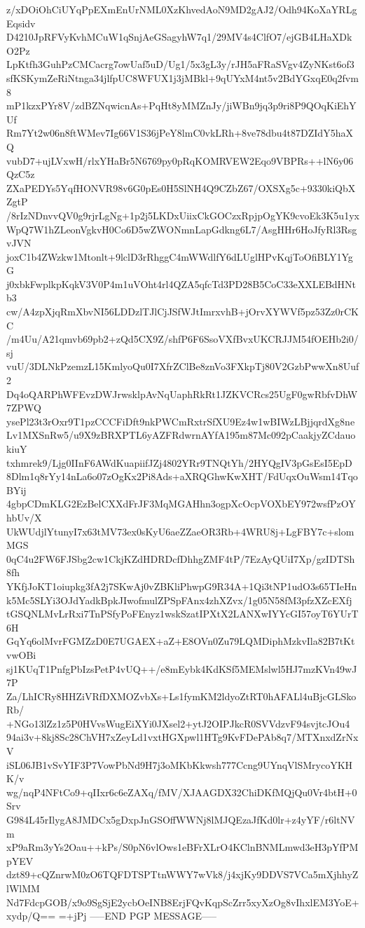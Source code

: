 z/xDOiOhCiUYqPpEXmEnUrNML0XzKhvedAoN9MD2gAJ2/Odh94KoXaYRLgEqsidv
D4210JpRFVyKvhMCuW1qSnjAeGSagyhW7q1/29MV4s4ClfO7/ejGB4LHaXDkO2Pz
LpKtfh3GuhPzCMCacrg7owUaf5uD/Ug1/5x3gL3y/rJH5aFRaSVgv4ZyNKst6of3
sfKSKymZeRiNtnga34jlfpUC8WFUX1j3jMBkl+9qUYxM4nt5v2BdYGxqE0q2fvm8
mP1kzxPYr8V/zdBZNqwicnAs+PqHt8yMMZnJy/jiWBn9jq3p9ri8P9QOqKiEhYUf
Rm7Yt2w06n8ftWMev7Ig66V1S36jPeY8lmC0vkLRh+8ve78dbu4t87DZIdY5haXQ
vubD7+ujLVxwH/rlxYHaBr5N6769py0pRqKOMRVEW2Eqo9VBPRs++lN6y06QzC5z
ZXaPEDYs5YqfHONVR98v6G0pEs0H5SlNH4Q9CZbZ67/OXSXg5c+9330kiQbXZgtP
/8rIzNDnvvQV0g9rjrLgNg+1p2j5LKDxUiixCkGOCzxRpjpOgYK9cvoEk3K5u1yx
WpQ7W1hZLeonVgkvH0Co6D5wZWONmnLapGdkng6L7/AsgHHr6HoJfyRl3RsgvJVN
joxC1b4ZWzkw1Mtonlt+9lclD3rRhggC4mWWdlfY6dLUglHPvKqjToOfiBLY1YgG
j0xbkFwplkpKqkV3V0P4m1uVOht4rl4QZA5qfcTd3PD28B5CoC33eXXLEBdHNtb3
cw/A4zpXjqRmXbvNI56LDDzlTJlCjJSfWJtImrxvhB+jOrvXYWVf5pz53Zz0rCKC
/m4Uu/A21qmvb69pb2+zQd5CX9Z/shfP6F6SsoVXfBvxUKCRJJM54fOEHb2i0/sj
vuU/3DLNkPzemzL15KmlyoQu0I7XfrZClBe8znVo3FXkpTj80V2GzbPwwXn8Uuf2
Dq4oQARPhWFEvzDWJrwsklpAvNqUaphRkRt1JZKVCRcs25UgF0gwRbfvDhW7ZPWQ
ysePl23t3rOxr9T1pzCCCFiDft9nkPWCmRxtrSfXU9Ez4w1wBIWzLBjjqrdXg8ne
Lv1MXSnRw5/u9X9zBRXPTL6yAZFRdwrnAYfA195m87Mc092pCaakjyZCdauokiuY
txhmrek9/Ljg0IInF6AWdKuapiifJZj4802YRr9TNQtYh/2HYQgIV3pGsEsI5EpD
8Dlm1q8rYy14nLa6o07zOgKx2Pi8Ads+aXRQGhwKwXHT/FdUqxOuWsm14TqoBYij
4gbpCDmKLG2EzBelCXXdFrJF3MqMGAHhn3ogpXcOcpVOXbEY972wsfPzOYhbUv/X
UkWUdjlYtunyI7x63tMV73ex0sKyU6aeZZaeOR3Rb+4WRU8j+LgFBY7c+slomMGS
0qC4u2FW6FJSbg2cw1CkjKZdHDRDcfDhhgZMF4tP/7EzAyQUiI7Xp/gzIDTSh8fh
YKfjJoKT1oiupkg3fA2j7SKwAj0vZBKliPhwpG9R34A+1Qi3tNP1udO3s65TIeHn
k5Mc5SLYi3OJdYadkBpkJIwofmulZPSpFAnx4zhXZvx/1g05N58fM3pfzXZcEXfj
tGSQNLMvLrRxi7TnPSfyPoFEnyz1wskSzatIPXtX2LANXwIYYcGI57oyT6YUrT6H
GqYq6olMvrFGMZzD0E7UGAEX+aZ+E8OVn0Zu79LQMDiphMzkvIla82B7tKtvwOBi
sj1KUqT1PnfgPbIzsPetP4vUQ++/e8mEybk4KdKSf5MEMslwl5HJ7mzKVn49wJ7P
Za/LhICRy8HHZiVRfDXMOZvbXs+Ls1fymKM2ldyoZtRT0hAFALl4uBjcGLSkoRb/
+NGo13lZz1z5P0HVvsWugEiXYi0JXsel2+ytJ2OIPJkcR0SVVdzvF94svjtcJOu4
94ai3v+8kj8Sc28ChVH7xZeyLd1vxtHGXpwl1HTg9KvFDePAb8q7/MTXnxdZrNxV
iSL06JB1vSvYIF3P7VowPbNd9H7j3oMKbKkwsh777Ccng9UYnqVlSMrycoYKHK/v
wg/nqP4NFtCo9+qIIxr6c6eZAXq/fMV/XJAAGDX32ChiDKfMQjQu0Vr4btH+0Srv
G984L45rIlygA8JMDCx5gDxpJnGSOffWWNj8lMJQEzaJfKd0lr+z4yYF/r6ltNVm
xP9aRm3yYs2Oau++kPs/S0pN6vlOws1eBFrXLrO4KClnBNMLmwd3eH3pYfPMpYEV
dzt89+cQZnrwM0zO6TQFDTSPTtnWWY7wVk8/j4xjKy9DDVS7VCa5mXjhhyZlWlMM
Nd7FdcpGOB/x9o9SgSjE2ycbOeINB8ErjFQvKqpScZrr5xyXzOg8vIhxlEM3YoE+
xydp/Q==
=+jPj
-----END PGP MESSAGE-----
